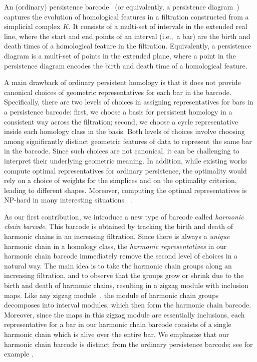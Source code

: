 \documentclass[10pt,a4paper]{amsart}
\newcommand{\hcd}{{harmonic chain barcode}}
\newcommand{\hcb}{{harmonic chain barcode}}
\theoremstyle{definition}
\theoremstyle{remark}
\begin{document}
An (ordinary) persistence barcode~\cite{CarlssonZomorodianCollins2004,Ghrist2008} (or equivalently, a persistence diagram~\cite{ChazalCohenSteinerGlisse2009, Cohen-SteinerEdelsbrunnerHarer2005, EdelsbrunnerLetscherZomorodian2002}) captures the evolution of homological features in a filtration constructed from a simplicial complex $K$. 
It consists of a multi-set of intervals in the extended real line, where the start and end points of an interval (i.e.,~a bar) are the birth and death times of a homological feature in the filtration. 
Equivalently, a persistence diagram is a multi-set of points in the extended plane, where a point in the persistence diagram encodes the birth and death time of a homological feature. 

A main drawback of ordinary persistent homology is that it does not provide canonical choices of geometric representatives for each bar in the barcode. 
Specifically, there are two levels of choices in assigning representatives for bars in a persistence barcode: first, we choose a basis for persistent homology in a consistent way across the filtration; second, we choose a cycle representative inside each homology class in the basis. Both levels of choices involve choosing among significantly distinct geometric features of data to represent the same bar in the barcode. Since such choices are not canonical, it can be challenging to interpret their underlying geometric meaning. In addition, while existing works~\cite{Oleksiy2010,DeyHouMandal2020, Obayashi2018} compute optimal representatives for ordinary persistence, the optimality would rely on a choice of weights for the simplices and on the optimality criterion, leading to different shapes. Moreover, computing the optimal representatives is NP-hard in many interesting situations  ~\cite{ChenFreedman2011, chambers2019minimum, Chambers2009, Borradaile2020, Grochow2018, DeyHouMandal2020}.


As our first contribution, we introduce a new type of barcode called  \emph{\hcb}. This barcode is obtained by tracking the birth and death of harmonic chains in an increasing filtration.  
Since there is always a \emph{unique} harmonic chain in a homology class, the \emph{harmonic representatives} in our {\hcb} immediately remove the second level of choices in a natural way. The main idea is to take the harmonic chain groups along an increasing filtration, and to observe that the groups grow or shrink due to the birth and death of harmonic chains, resulting in a zigzag module with inclusion maps. 
Like any zigzag module~\cite{CarlssonSilva2010}, the module of harmonic chain groups decomposes into interval modules, which then form the {\hcd}.
Moreover, since the maps in this zigzag module are essentially inclusions,
each representative for a bar in our {\hcb} consists of a single harmonic chain which is alive over the entire bar. We emphasize that our {\hcb} is distinct from the ordinary persistence barcode; see for example . 
\end{document}

